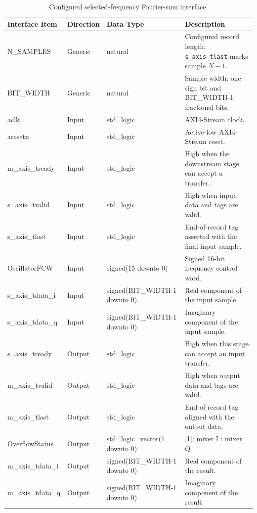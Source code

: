 \begin{table}[H]
\singlespacing
\small
\setlength{\tabcolsep}{2pt}
\renewcommand{\arraystretch}{0.95}
\begin{center}
\caption{Configured selected-frequency Fourier-sum interface.}
\begin{tabularx}{\textwidth}{|L{0.24\textwidth}|L{0.13\textwidth}|L{0.28\textwidth}|Y|}
\hline
\textbf{Interface Item} & \textbf{Direction} & \textbf{Data Type} & \textbf{Description} \\
\hline
N\_SAMPLES         & Generic & natural & Configured record length; \texttt{s\_axis\_tlast} marks sample $N-1$. \\
\hline
BIT\_WIDTH         & Generic & natural & Sample width: one sign bit and BIT\_WIDTH-1 fractional bits. \\
\hline
aclk               & Input & std\_logic & AXI4-Stream clock. \\
\hline
aresetn            & Input & std\_logic & Active-low AXI4-Stream reset. \\
\hline
m\_axis\_tready    & Input & std\_logic & High when the downstream stage can accept a transfer. \\
\hline
s\_axis\_tvalid    & Input & std\_logic & High when input data and tags are valid. \\
\hline 
s\_axis\_tlast     & Input & std\_logic & End-of-record tag asserted with the final input sample. \\
\hline
OscillatorFCW      & Input & signed(15 downto 0) & Signed 16-bit frequency control word. \\
\hline
s\_axis\_tdata\_i  & Input & signed(BIT\_WIDTH-1 \newline downto 0) & Real component of the input sample. \\
\hline
s\_axis\_tdata\_q  & Input & signed(BIT\_WIDTH-1 \newline downto 0) & Imaginary component of the input sample. \\
\hline
s\_axis\_tready    & Output & std\_logic & High when this stage can accept an input transfer. \\
\hline
m\_axis\_tvalid    & Output & std\_logic & High when output data and tags are valid. \\
\hline
m\_axis\_tlast     & Output & std\_logic & End-of-record tag aligned with the output data. \\
\hline
OverflowStatus     & Output & std\_logic\_vector(1 \newline downto 0) & [1]: mixer I \newline [0]: mixer Q \\
\hline
m\_axis\_tdata\_i  & Output & signed(BIT\_WIDTH-1 \newline downto 0) & Real component of the result. \\
\hline
m\_axis\_tdata\_q  & Output & signed(BIT\_WIDTH-1 \newline downto 0) & Imaginary component of the result. \\
\hline
\end{tabularx}
\end{center}
\end{table}

